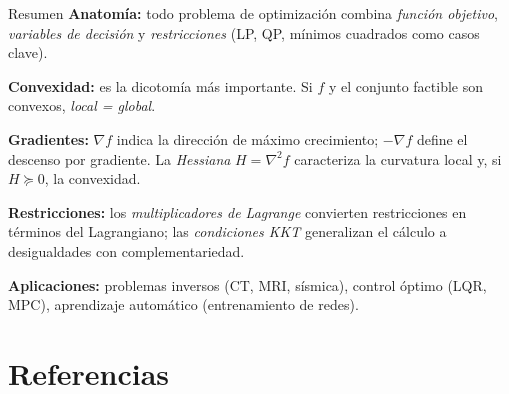 \documentclass[10pt,aspectratio=169]{beamer}
\theoremstyle{definition}
\theoremstyle{plain}
\begin{document}
\begin{frame}[t]{Resumen}
  \textbf{Anatomía:} todo problema de optimización combina
  \emph{función objetivo}, \emph{variables de decisión} y
  \emph{restricciones} (LP, QP, mínimos cuadrados como casos clave).

  \vspace{0.15em}
  \textbf{Convexidad:} es la dicotomía más importante. Si $f$ y el
  conjunto factible son convexos, \emph{local = global}.

  \vspace{0.15em}
  \textbf{Gradientes:} $\nabla f$ indica la dirección de máximo crecimiento;
  $-\nabla f$ define el descenso por gradiente. La \emph{Hessiana}
  $H=\nabla^{2}f$ caracteriza la curvatura local y, si $H\succeq 0$, la
  convexidad.

  \vspace{0.15em}
  \textbf{Restricciones:} los \emph{multiplicadores de Lagrange} convierten
  restricciones en términos del Lagrangiano; las \emph{condiciones KKT}
  generalizan el cálculo a desigualdades con complementariedad.

  \vspace{0.15em}
  \textbf{Aplicaciones:} problemas inversos (CT, MRI, sísmica), control
  óptimo (LQR, MPC), aprendizaje automático (entrenamiento de redes).
\end{frame}

\section*{Referencias}
\end{document}

